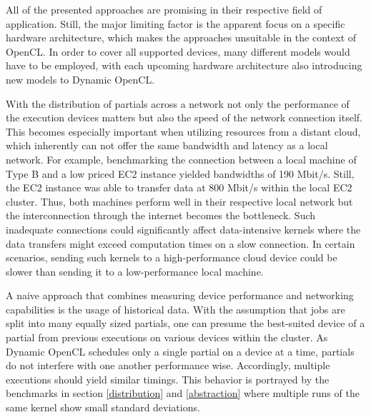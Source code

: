 All of the presented approaches are promising in their respective field of application. Still, the major limiting factor is the apparent focus on a specific hardware architecture, which makes the approaches unsuitable in the context of OpenCL. In order to cover all supported devices, many different models would have to be employed, with each upcoming hardware architecture also introducing new models to Dynamic OpenCL.

With the distribution of partials across a network not only the performance of the execution devices matters but also the speed of the network connection itself. This becomes especially important when utilizing resources from a distant cloud, which inherently can not offer the same bandwidth and latency as a local network. For example, benchmarking the connection between a local machine of Type B and a low priced EC2 instance yielded bandwidths of 190 Mbit/s. Still, the EC2 instance was able to transfer data at 800 Mbit/s within the local EC2 cluster. Thus, both machines perform well in their respective local network but the interconnection through the internet becomes the bottleneck. Such inadequate connections could significantly affect data-intensive kernels where the data transfers might exceed computation times on a slow connection. In certain scenarios, sending such kernels to a high-performance cloud device could be slower than sending it to a low-performance local machine.

A naive approach that combines measuring device performance and networking capabilities is the usage of historical data. With the assumption that jobs are split into many equally sized partials, one can presume the best-suited device of a partial from previous executions on various devices within the cluster. As Dynamic OpenCL schedules only a single partial on a device at a time, partials do not interfere with one another performance wise. Accordingly, multiple executions should yield similar timings. This behavior is portrayed by the benchmarks in section \ref{distribution} and \ref{abstraction} where multiple runs of the same kernel show small standard deviations.

